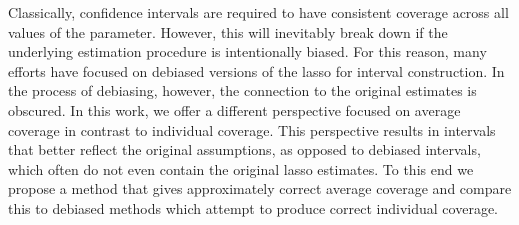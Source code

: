 Classically, confidence intervals are required to have consistent coverage across all values of the parameter. However, this will inevitably break down if the underlying estimation procedure is intentionally biased. For this reason, many efforts have focused on debiased versions of the lasso for interval construction. In the process of debiasing, however, the connection to the original estimates is obscured. In this work, we offer a different perspective focused on average coverage in contrast to individual coverage. This perspective results in intervals that better reflect the original assumptions, as opposed to debiased intervals, which often do not even contain the original lasso estimates. To this end we propose a method that gives approximately correct average coverage and compare this to debiased methods which attempt to produce correct individual coverage.
